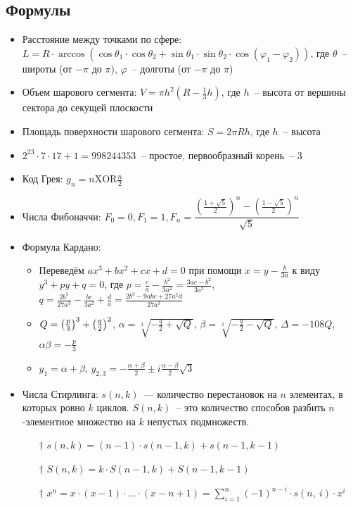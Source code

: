 \documentclass[10pt, portrait,letterpaper]{article}
\def\xor{\mathbin{\mathrm{XOR}}}
\begin{document}
\subsection {Формулы}
\begin{itemize}
    \item  Расстояние между точками по сфере: $L = R \cdot \arccos(\cos\theta _1 \cdot \cos\theta _2 +\sin\theta _1 \cdot \sin\theta _2 \cdot \cos(\varphi _1 - \varphi _2))$, где $\theta$~-- широты (от $- \pi$ до $\pi$), $\varphi$~-- долготы (от $- \pi$ до $\pi$)
    \item Объем шарового сегмента: $V = \pi h^2(R - \frac{1}{3}h)$, где $h$~-- высота от вершины сектора до секущей плоскости
    \item Площадь поверхности шарового сегмента: $S = 2\pi Rh$, где $h$~-- высота
    \item $2^{23} \cdot 7 \cdot 17 + 1 = \num{998244353}$~-- простое, первообразный корень~-- 3
    \item Код Грея: $g_n = n \xor \frac{n}{2}$
    \item Числа Фибоначчи: $F_0 = 0, F_1 = 1, F_n = \dfrac{\left(\frac{1 + \sqrt{5}}{2}\right)^n - \left(\frac{1 - \sqrt{5}}{2}\right)^n}{\sqrt{5}}$
    \item Формула Кардано:
    \begin{itemize}
    	\item Переведём $ax^3+bx^2+cx+d=0$ при помощи $x=y-\frac b{3a}$ к виду $y^3+py+q=0$, где $p=\frac ca-\frac{b^2}{3a^2}=\frac{3ac-b^2}{3a^2}$, $q=\frac{2b^3}{27a^3}-\frac{bc}{3a^2}+\frac da=\frac{2b^3-9abc+27a^2d}{27a^3}$
    	\item $Q=\mleft(\frac p3\mright)^3+\mleft(\frac q2\mright)^2$, $\alpha=\sqrt[3]{-\frac q2+\sqrt Q}$, $\beta=\sqrt[3]{-\frac q2-\sqrt Q}$, $\Delta=-108Q$, $\alpha\beta=-\frac p3$
    	\item $y_1=\alpha+\beta$, $y_{2,3}=-\frac{\alpha+\beta}2\pm i\frac{\alpha-\beta}2\sqrt3$
    \end{itemize}

    \item Числа Стирлинга: $s(n, k)$~--- количество перестановок на $n$ элементах, в которых ровно $k$ циклов. $S(n, k)$~-- это количество способов разбить $n$-элементное множество на $k$ непустых подмножеств.
    \begin{itemize}
        \item[$\dagger$] $s(n, k) = (n - 1)\cdot s(n - 1, k) + s(n - 1, k - 1)$
        \item[$\dagger$] $S(n, k) = k\cdot S(n - 1, k) + S(n - 1, k - 1)$
        \item[$\dagger$] $x^{\underline n} = x \cdot (x - 1) \cdot ... \cdot (x - n + 1) =  
 \sum\limits_{i = 1}^n (-1)^{n - i} \cdot s(n, ~i) \cdot x^i $


\end{itemize}
\end{itemize}
\end{document}
